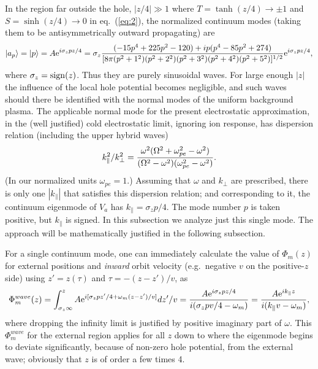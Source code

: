 \documentclass[12pt]{article}
\def\ket#1{|#1\rangle}
\def\etothe#1{{\rm e}^{#1}}
\begin{document}
In the region far outside the hole, $|z/4|\gg 1$ where
$T=\tanh(z/4)\to\pm1$ and $S=\sinh(z/4)\to0$ in eq.\ (\ref{eq:2}), the
normalized continuum modes (taking them to be antisymmetrically
outward propagating) are
\begin{equation}
  \label{eq:14}
 \ket{a_p}= \ket{p}=A\etothe{i\sigma_zpz/4}=\sigma_z{(-15p^4+225p^2-120) +ip (p^{4}-85p^{2}+274)\over
      [8\pi(p^2+1^2)(p^2+2^2)(p^2+3^2)(p^2+4^2)(p^2+5^2)]^{1/2}}\etothe{i\sigma_zpz/4},
\end{equation}
where $\sigma_z={\rm sign}(z)$. Thus they are purely sinusoidal
waves. For large enough $|z|$ the influence of the local hole
potential becomes negligible, and such waves should there be
identified with the normal modes of the uniform background plasma.
The applicable normal mode for the present electrostatic
approximation, in the (well justified) cold electrostatic limit,
ignoring ion response, has dispersion relation (including the upper
hybrid waves)
\begin{equation}
  \label{eq:15}
  k_\parallel^2/k_\perp^2={\omega^2(\Omega^2+\omega_{pe}^2-\omega^2)
    \over(\Omega^2-\omega^2)(\omega_{pe}^2-\omega^2)}.
\end{equation}
(In our normalized units $\omega_{pe}=1$.)  Assuming that $\omega$ and
$k_\perp$ are prescribed, there is only one $|k_\parallel|$ that
satisfies this dispersion relation; and corresponding to it, the
continuum eigenmode of $V_a$ has $k_\parallel=\sigma_zp/4$. The mode
number $p$ is taken positive, but $k_\parallel$ is signed. In this
subsection we analyze just this single mode. The approach will be
mathematically justified in the following subsection.

For a single continuum mode, one can immediately calculate the value
of $\Phi_m(z)$ for external positions and \emph{inward} orbit velocity
(e.g.\ negative $v$ on the positive-$z$ side) using $z'=z(\tau)$ and
$\tau=-(z-z')/v$, as
\begin{equation}
  \label{eq:16}
  \Phi_{m}^{wave}(z) = \int_{\sigma_z\infty}^zA{\rm e}^{i[\sigma_zpz'/4+\omega_m
    (z-z')/v]}dz'/v
  ={A{\rm e}^{i\sigma_zpz/4} \over i(\sigma_zpv/4-\omega_m)}={A{\rm e}^{ik_\parallel z} \over
    i(k_\parallel v-\omega_m)},
\end{equation}
where dropping the infinity limit is justified by positive imaginary
part of $\omega$.  This $\Phi_{m}^{wave}$ for the external 
region applies for all $z$ down to where the eigenmode begins to
deviate significantly, because of non-zero hole potential, from the
external wave; obviously that $z$ is of order a few times 4.
\end{document}
